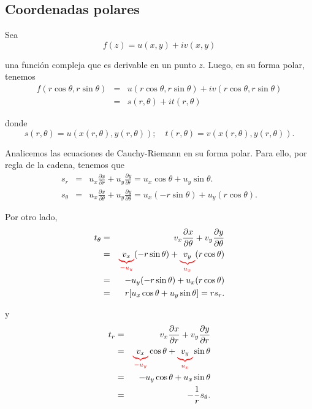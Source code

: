 \subsection{Coordenadas polares}

Sea 
$$f(z) = u(x,y) + iv(x,y)$$

una función compleja que es derivable en un punto $z$. Luego, en su forma polar, tenemos
\begin{eqnarray*}
f(r \cos\theta, r \sin \theta) &=& u(r \cos\theta, r \sin \theta) + i v(r \cos\theta, r \sin \theta) \\
&=& s(r,\theta) + it(r,\theta)
\end{eqnarray*}

donde 
$$s(r, \theta) = u(x(r,\theta), y(r,\theta)); \quad t(r, \theta) = v(x(r,\theta), y(r,\theta)).$$

Analicemos las ecuaciones de Cauchy-Riemann en su forma polar. Para ello, por regla de la cadena, tenemos que
\begin{eqnarray}
s_r &=& u_x \frac{\partial x}{\partial r } + u_y \frac{\partial y}{\partial r} = u_x \cos \theta + u_y \sin \theta.  \label{Polar1}\\
s_{\theta} &=& u_x \frac{\partial x}{\partial \theta } + u_y \frac{\partial y}{\partial \theta} =  u_x (-r \sin \theta) + u_y (r \cos \theta). \label{Polar2}
\end{eqnarray}

Por otro lado,
\begin{eqnarray}
t_{\theta} &=& v_x \frac{\partial x}{\partial \theta} + v_y \frac{\partial y}{\partial \theta} \\
&=& \color{red}\underbrace{\color{black}v_x}_{\color{red}-u_y} \color{black}(-r \sin \theta) + \color{red}\underbrace{\color{black}v_y}_{\color{red}u_x} \color{black}(r \cos \theta) \label{Polar3}\\
&=& -u_y (-r \sin \theta) + u_x (r \cos \theta)  \\
&=& r [u_x \cos \theta + u_y \sin \theta] = rs_r. 
\end{eqnarray}

y
\begin{eqnarray}
t_{r} &=& v_x \frac{\partial x}{\partial r} + v_y \frac{\partial y}{\partial r} \\
&=& \color{red}\underbrace{\color{black}v_x}_{\color{red}-u_y}\color{black} \cos \theta + \color{red}\underbrace{\color{black}v_y}_{\color{red}u_x} \color{black}\sin\theta \label{Polar4}  \\
&=& -u_y \cos\theta + u_x\sin\theta \\
&=& - \frac{1}{r} s_{\theta}. 
\end{eqnarray}

